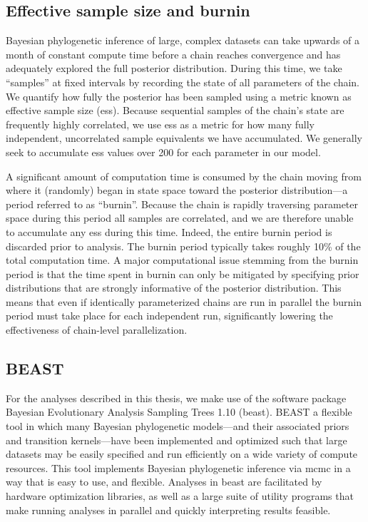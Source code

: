 \subsection{Effective sample size and burnin}
\label{sec:ess}

Bayesian phylogenetic inference of large, complex datasets can take upwards of a month of constant compute time before a chain reaches convergence and has adequately explored the full posterior distribution.
During this time, we take ``samples'' at fixed intervals by recording the state of all parameters of the chain.
We quantify how fully the posterior has been sampled using a metric known as effective sample size (\gls{ess}).
Because sequential samples of the chain's state are frequently highly correlated, we use \gls{ess} as a metric for how many fully independent, uncorrelated sample equivalents we have accumulated.
We generally seek to accumulate \gls{ess} values over 200 for each parameter in our model. 

A significant amount of computation time is consumed by the chain moving from where it (randomly) began in state space toward the posterior distribution---a period referred to as ``burnin''.
Because the chain is rapidly traversing parameter space during this period all samples are correlated, and we are therefore unable to accumulate any \gls{ess} during this time.
Indeed, the entire burnin period is discarded prior to analysis.
The burnin period typically takes roughly 10\% of the total computation time.
A major computational issue stemming from the burnin period is that the time spent in burnin can only be mitigated by specifying prior distributions that are strongly informative of the posterior distribution.
This means that even if identically parameterized chains are run in parallel the burnin period must take place for each independent run, significantly lowering the effectiveness of chain-level parallelization.


\subsection{BEAST}

For the analyses described in this thesis, we make use of the software package Bayesian Evolutionary Analysis Sampling Trees 1.10 \cite{beast} (\gls{beast}).
BEAST a flexible tool in which many Bayesian phylogenetic models---and their associated priors and transition kernels---have been implemented and optimized such that large datasets may be easily specified and run efficiently on a wide variety of compute resources.
This tool implements Bayesian phylogenetic inference via \gls{mcmc} in a way that is easy to use, and flexible.
Analyses in \gls{beast} are facilitated by hardware optimization libraries\cite{beagle}, as well as a large suite of utility programs that make running analyses in parallel and quickly interpreting results feasible.

